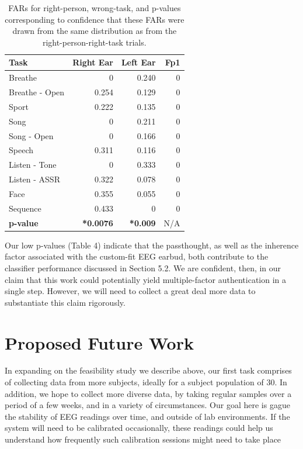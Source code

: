 \documentclass[11pt]{article}
\begin{document}
\begin{table}[h]
\centering
\begin{tabular}{lrrr}
\textbf{Task} & \textbf{Right Ear} & \textbf{Left Ear} & \textbf{Fp1}\\
\hline
Breathe & 0 & 0.240 & 0\\
Breathe - Open & 0.254 & 0.129 & 0\\
Sport & 0.222 & 0.135 & 0\\
Song & 0 & 0.211 & 0\\
Song - Open & 0 & 0.166 & 0\\
Speech & 0.311 & 0.116 & 0\\
Listen - Tone & 0 & 0.333 & 0\\
Listen - ASSR & 0.322 & 0.078 & 0\\
Face & 0.355 & 0.055 & 0\\
Sequence & 0.433 & 0 & 0\\
\hline
\textbf{p-value} & \textbf{*0.0076} & \textbf{*0.009} & N/A\\
\end{tabular}
\caption{FARs for right-person, wrong-task, and p-values corresponding to confidence that these FARs were drawn from the same distribution as from the right-person-right-task trials.}
\end{table}

Our low p-values (Table 4) indicate that the passthought, as well as the inherence
factor associated with the custom-fit EEG earbud, both contribute to the classifier
performance discussed in Section 5.2. We are confident, then, in our claim that this work
could potentially yield multiple-factor authentication in a single step. However, we
will need to collect a great deal more data to substantiate this claim rigorously.

\section{Proposed Future Work}

In expanding on the feasibility study we describe above, 
our first task comprises of collecting data from more subjects,
ideally for a subject population of 30.
In addition, we hope to collect more diverse data,
by taking regular samples over a period of a few weeks,
and in a variety of circumstances. Our goal here is gague the stability
of EEG readings over time, and outside of lab environments.
If the system will need to be calibrated occasionally, these readings
could help us understand how frequently such calibration sessions
might need to take place
\end{document}
